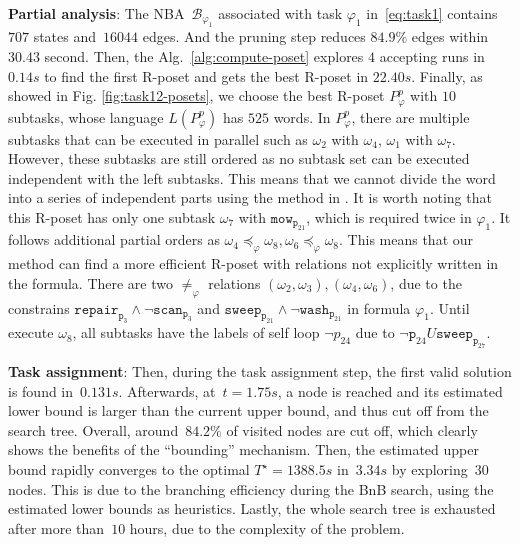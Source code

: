 \textbf{Partial analysis}:
The NBA~$\mathcal{B}_{\varphi_1}$ associated with task $\varphi_1$ in~\eqref{eq:task1}
contains~$707$ states and~$16044$ edges. And the pruning step reduces $84.9\%$ edges within
$30.43$ second. Then, the Alg.~\ref{alg:compute-poset} explores
 $4$ accepting runs in $0.14s$ to find the first R-poset and gets the best R-poset in $22.40s$.
 Finally, as showed in Fig. \ref{fig:task12-posets}, we choose the best R-poset $P^{p}_{\varphi}$ with $10$ subtasks, whose language
 $L(P^{p}_{\varphi})$ has $525$ {words}. In $P^{p}_{\varphi}$, there are
 multiple subtasks that can be executed in parallel such as $\omega_2 $ with $ \omega_4$, $\omega_1 $ with $ \omega_7$.
 However, these subtasks are still ordered as no subtask set can be executed independent with the left
 subtasks. This means that we cannot
 divide the word into a series of independent parts using the method in \citep{schillinger2018simultaneous}.
 It is worth noting that this R-poset has only one subtask $\omega_7$ with $\texttt{mow}_{\texttt{p}_{21}}$,
 which is required twice in $\varphi_1$. It follows additional partial orders as
 $\omega_4\preceq_\varphi \omega_8,\omega_6\preceq_\varphi \omega_8$. This means that our method can find
 a more efficient R-poset with relations not explicitly written in the formula.
 There are two $\neq_\varphi$ relations $(\omega_2,\omega_3),(\omega_4,\omega_6)$, due to the constrains
 $\texttt{repair}_{\texttt{p}_3}\wedge\lnot\texttt{scan}_{\texttt{p}_3} $ and
  $\texttt{sweep}_{\texttt{p}_{21}} \wedge \lnot \texttt{wash}_{\texttt{p}_{21}}$ in formula $\varphi_1$.
  Until execute $\omega_8$, all subtasks have the labels of self loop  $\lnot p_{24}$ due to
   $\lnot \texttt{p}_{24} U \texttt{sweep}_{\texttt{p}_{27}}$.



\textbf{Task assignment}:
Then, during the task assignment step,
the first valid solution is found in~$0.131s$.
Afterwards, at~$t=1.75s$, a node is reached and its estimated lower
bound is larger than the current upper bound, and thus cut off from the search tree.
Overall, around~$84.2\%$ of visited nodes are cut off,
which clearly shows the benefits of the ``bounding'' mechanism.
Then, the estimated upper bound rapidly converges
to the optimal $T^\star=1388.5s$ in~$3.34s$ by exploring~$30$ nodes.
This is due to the branching efficiency during the BnB search,
using the estimated lower bounds as heuristics.
Lastly, the whole search tree is exhausted after more than~$10$ hours,
due to the complexity of the problem.


